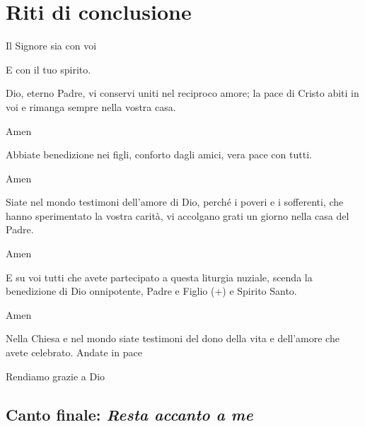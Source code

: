\newpage

\section*{Riti di conclusione}

	\begin{dialoghi}
		\item[\sacerdote] Il Signore sia con voi
		\item[\assemblea] E con il tuo spirito.
		\item[\sacerdote] Dio, eterno Padre, vi conservi uniti nel reciproco amore; la pace di Cristo abiti in voi e rimanga sempre nella vostra casa.
		\item[\assemblea] Amen
		\item[\sacerdote] Abbiate benedizione nei figli, conforto dagli amici, vera pace con tutti.
		\item[\assemblea] Amen
		\item[\sacerdote] Siate nel mondo testimoni dell'amore di Dio, perché i poveri e i sofferenti, che hanno sperimentato la vostra carità, vi accolgano grati un giorno nella casa del Padre.
		\item[\assemblea] Amen
		\item[\sacerdote] E su voi tutti che avete partecipato a questa liturgia nuziale, scenda la benedizione di Dio onnipotente, Padre e Figlio (+) e Spirito Santo.
		\item[\assemblea] Amen
		\item[\sacerdote] Nella Chiesa e nel mondo siate testimoni del dono della vita e dell'amore che avete celebrato. Andate in pace
		\item[\assemblea] Rendiamo grazie a Dio
	\end{dialoghi}

\newpage

\subsection*{Canto finale: \textit{Resta accanto a me}}

	\begin{mystrofe}
	\end{mystrofe}

